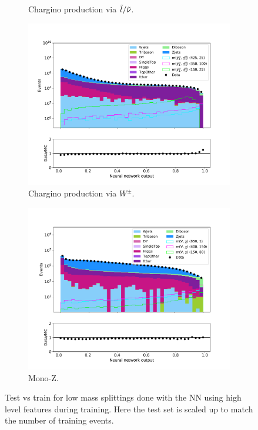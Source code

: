 \begin{figure}[H]
\begin{subfigure}[t!]{0.49\textwidth}
        \caption{Chargino production via $\Tilde{l}/\Tilde{\nu}$.}
        \label{fig:}
    \end{subfigure}      
    \begin{subfigure}[t!]{0.49\textwidth}
        \includegraphics[width = \textwidth]{Figures/Stacked/stackedplot_NN_High_level_WW.pdf}
        \caption{Chargino production via $W^\pm$.}
        \label{fig:}
    \end{subfigure}
    \begin{subfigure}[t!]{0.49\textwidth}
        \includegraphics[width = \textwidth]{Figures/Stacked/stackedplot_NN_High_level_monoZ.pdf}
        \caption{Mono-Z.}
        \label{fig:}
    \end{subfigure}
    \caption{Test vs train for low mass splittings done with the NN using high level features during training. Here the test set is scaled up to match the number of training events.}
    \label{fig:}
\end{figure}


